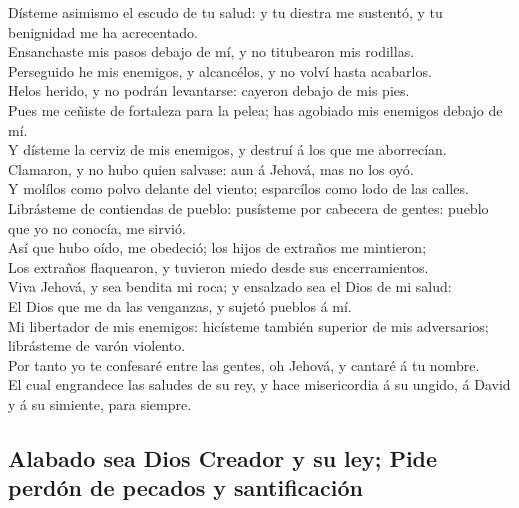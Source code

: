  Dísteme asimismo el escudo de tu salud: y tu diestra me
sustentó, y tu benignidad me ha acrecentado.\\
 Ensanchaste mis pasos debajo de mí, y no titubearon mis
rodillas.\\
 Perseguido he mis enemigos, y alcancélos, y no volví
hasta acabarlos.\\
 Helos herido, y no podrán levantarse: cayeron debajo de
mis pies.\\
 Pues me ceñiste de fortaleza para la pelea; has agobiado
mis enemigos debajo de mí.\\
 Y dísteme la cerviz de mis enemigos, y destruí á los que
me aborrecían.\\
 Clamaron, y no hubo quien salvase: aun á Jehová, mas no
los oyó.\\
 Y molílos como polvo delante del viento; esparcílos como
lodo de las calles.\\
 Librásteme de contiendas de pueblo: pusísteme por
cabecera de gentes: pueblo que yo no conocía, me sirvió.\\
 Así que hubo oído, me obedeció; los hijos de extraños me
mintieron;\\
 Los extraños flaquearon, y tuvieron miedo desde sus
encerramientos.\\
 Viva Jehová, y sea bendita mi roca; y ensalzado sea el
Dios de mi salud:\\
 El Dios que me da las venganzas, y sujetó pueblos á
mí.\\
 Mi libertador de mis enemigos: hicísteme también
superior de mis adversarios; librásteme de varón violento.\\
 Por tanto yo te confesaré entre las gentes, oh Jehová, y
cantaré á tu nombre.\\
 El cual engrandece las saludes de su rey, y hace
misericordia á su ungido, á David y á su simiente, para siempre.

\hypertarget{alabado-sea-dios-creador-y-su-ley-pide-perduxf3n-de-pecados-y-santificaciuxf3n}{%
\subsection{Alabado sea Dios Creador y su ley; Pide perdón de pecados y
santificación}\label{alabado-sea-dios-creador-y-su-ley-pide-perduxf3n-de-pecados-y-santificaciuxf3n}}

